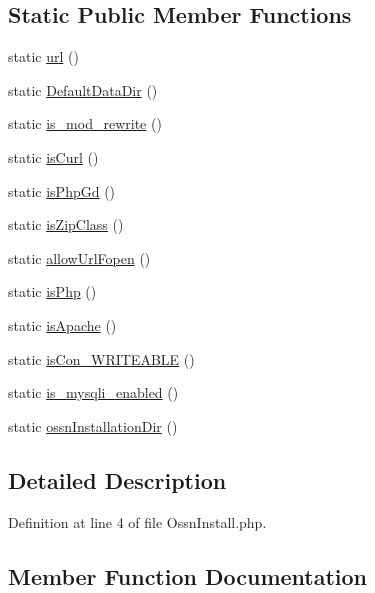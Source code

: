\subsection*{Static Public Member Functions}
\begin{DoxyCompactItemize}
\item 
static \hyperlink{class_ossn_installation_a66bae45e1a118d15d7b2b099251cca3b}{url} ()
\item 
static \hyperlink{class_ossn_installation_a9742dbad31dbc52fe980a6251da768ca}{Default\+Data\+Dir} ()
\item 
static \hyperlink{class_ossn_installation_a134e4fab41eef67a67a775961ef1a62a}{is\+\_\+mod\+\_\+rewrite} ()
\item 
static \hyperlink{class_ossn_installation_a348e588ae843eab470b7ac2494d8caf8}{is\+Curl} ()
\item 
static \hyperlink{class_ossn_installation_a2c4d71cf89981129424330fe76217fe7}{is\+Php\+Gd} ()
\item 
static \hyperlink{class_ossn_installation_a0b6313c81a9a89370d8c4dc2365e1166}{is\+Zip\+Class} ()
\item 
static \hyperlink{class_ossn_installation_a05b042f0536f12543b67f7bd59ac82bc}{allow\+Url\+Fopen} ()
\item 
static \hyperlink{class_ossn_installation_a4c0d148a0a9e4e42d95daeb6c877e522}{is\+Php} ()
\item 
static \hyperlink{class_ossn_installation_a3aa7519e6241cd85a530a559504c7113}{is\+Apache} ()
\item 
static \hyperlink{class_ossn_installation_a54fb55cd0aad47250d647feb8eca6bbd}{is\+Con\+\_\+\+W\+R\+I\+T\+E\+A\+B\+LE} ()
\item 
static \hyperlink{class_ossn_installation_a9d078ba3e225246d476cf1e81cbb30e9}{is\+\_\+mysqli\+\_\+enabled} ()
\item 
static \hyperlink{class_ossn_installation_a808592454e381b5cf216bd031f02187d}{ossn\+Installation\+Dir} ()
\end{DoxyCompactItemize}


\subsection{Detailed Description}


Definition at line 4 of file Ossn\+Install.\+php.



\subsection{Member Function Documentation}
